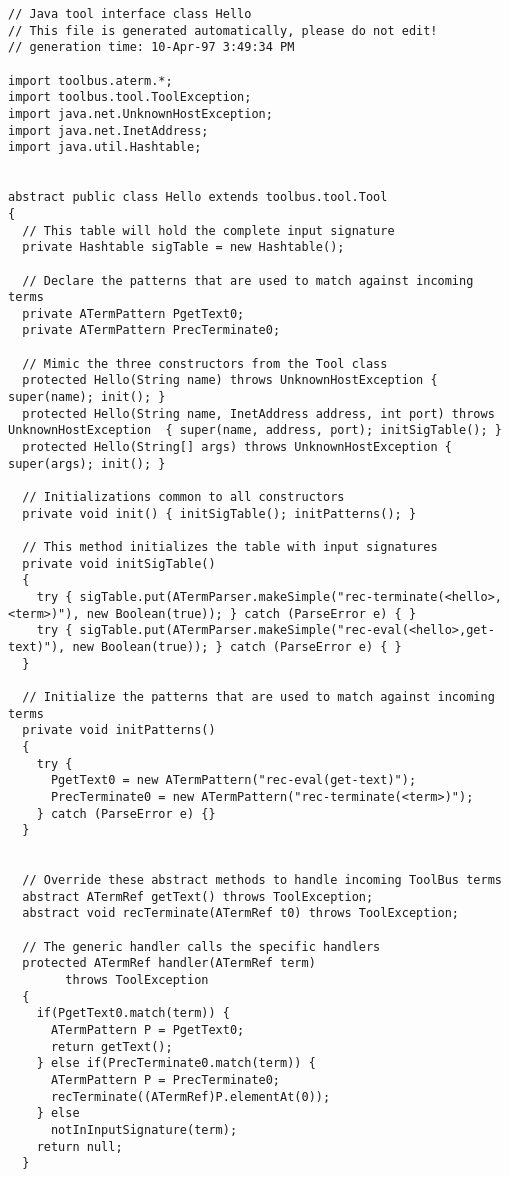 \begin{verbatim}
// Java tool interface class Hello
// This file is generated automatically, please do not edit!
// generation time: 10-Apr-97 3:49:34 PM

import toolbus.aterm.*;
import toolbus.tool.ToolException;
import java.net.UnknownHostException;
import java.net.InetAddress;
import java.util.Hashtable;


abstract public class Hello extends toolbus.tool.Tool
{
  // This table will hold the complete input signature
  private Hashtable sigTable = new Hashtable();

  // Declare the patterns that are used to match against incoming terms
  private ATermPattern PgetText0;
  private ATermPattern PrecTerminate0;

  // Mimic the three constructors from the Tool class
  protected Hello(String name) throws UnknownHostException { super(name); init(); }
  protected Hello(String name, InetAddress address, int port) throws UnknownHostException  { super(name, address, port); initSigTable(); }
  protected Hello(String[] args) throws UnknownHostException { super(args); init(); }

  // Initializations common to all constructors
  private void init() { initSigTable(); initPatterns(); }

  // This method initializes the table with input signatures
  private void initSigTable()
  {
    try { sigTable.put(ATermParser.makeSimple("rec-terminate(<hello>,<term>)"), new Boolean(true)); } catch (ParseError e) { }
    try { sigTable.put(ATermParser.makeSimple("rec-eval(<hello>,get-text)"), new Boolean(true)); } catch (ParseError e) { }
  }

  // Initialize the patterns that are used to match against incoming terms
  private void initPatterns()
  {
    try {
      PgetText0 = new ATermPattern("rec-eval(get-text)");
      PrecTerminate0 = new ATermPattern("rec-terminate(<term>)");
    } catch (ParseError e) {}
  }


  // Override these abstract methods to handle incoming ToolBus terms
  abstract ATermRef getText() throws ToolException;
  abstract void recTerminate(ATermRef t0) throws ToolException;

  // The generic handler calls the specific handlers
  protected ATermRef handler(ATermRef term)
        throws ToolException
  {
    if(PgetText0.match(term)) {
      ATermPattern P = PgetText0;
      return getText();
    } else if(PrecTerminate0.match(term)) {
      ATermPattern P = PrecTerminate0;
      recTerminate((ATermRef)P.elementAt(0));
    } else 
      notInInputSignature(term);
    return null;
  }


\end{verbatim}

